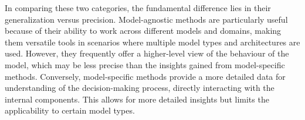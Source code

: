 In comparing these two categories, the fundamental difference lies in their generalization versus precision.
Model-agnostic methods are particularly useful because of their ability to work across different models and domains,
making them versatile tools in scenarios where multiple model types and architectures are used.
However, they frequently offer a higher-level view of the behaviour of the model, which may be less precise than the
insights gained from model-specific methods.
Conversely, model-specific methods provide a more detailed data for understanding of the decision-making process,
directly interacting with the internal components.
This allows for more detailed insights but limits the applicability to certain model types.






